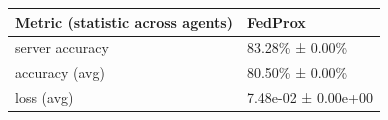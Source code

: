 \begin{tabular}{ll}
\hline
 Metric (statistic across agents)   & FedProx             \\
\hline
 server accuracy                    & 83.28\% ± 0.00\%      \\
 accuracy (avg)                     & 80.50\% ± 0.00\%      \\
 loss (avg)                         & 7.48e-02 ± 0.00e+00 \\
\hline
\end{tabular}
